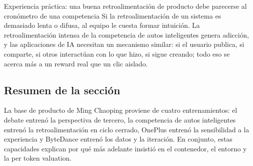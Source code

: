 \begin{importantbox}{Experiencia práctica: una buena retroalimentación de producto debe parecerse al cronómetro de una competencia}
Si la retroalimentación de un sistema es demasiado lenta o difusa, al equipo le cuesta formar intuición. La retroalimentación intensa de la competencia de autos inteligentes genera adicción, y las aplicaciones de IA necesitan un mecanismo similar: si el usuario publica, si comparte, si otros interactúan con lo que hizo, si sigue creando; todo eso se acerca más a un reward real que un clic aislado.
\end{importantbox}

\subsection{Resumen de la sección}

La base de producto de Ming Chaoping proviene de cuatro entrenamientos: el debate entrenó la perspectiva de tercero, la competencia de autos inteligentes entrenó la retroalimentación en ciclo cerrado, OnePlus entrenó la sensibilidad a la experiencia y ByteDance entrenó los datos y la iteración. En conjunto, estas capacidades explican por qué más adelante insistió en el contenedor, el entorno y la per token valuation.
